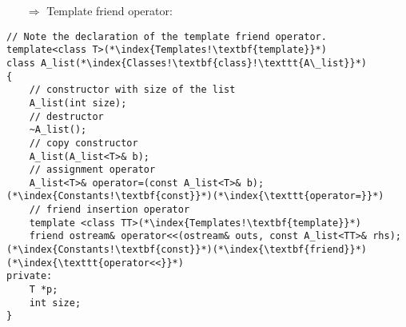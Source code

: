 \documentclass[10pt]{article}
\begin{document}
\begin{enumerate}
\item[$\Rightarrow$] Template friend operator:
\end{enumerate}
\begin{lstlisting}
// Note the declaration of the template friend operator.
template<class T>(*\index{Templates!\textbf{template}}*)
class A_list(*\index{Classes!\textbf{class}!\texttt{A\_list}}*)
{
    // constructor with size of the list
    A_list(int size);
    // destructor
    ~A_list();
    // copy constructor
    A_list(A_list<T>& b);
    // assignment operator
    A_list<T>& operator=(const A_list<T>& b);(*\index{Constants!\textbf{const}}*)(*\index{\texttt{operator=}}*)
    // friend insertion operator
    template <class TT>(*\index{Templates!\textbf{template}}*)
    friend ostream& operator<<(ostream& outs, const A_list<TT>& rhs);(*\index{Constants!\textbf{const}}*)(*\index{\textbf{friend}}*)(*\index{\texttt{operator<<}}*)
private:
    T *p;
    int size;
}
\end{lstlisting}
%
%
\end{document}
